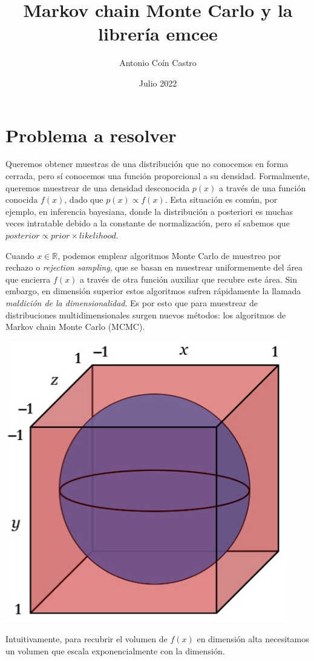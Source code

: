 \documentclass[
  a4paper,
	fontsize=11pt, %
	twoside=false, %
  secnumdepth=2,
	numbers=noenddot, %
]{kaohandt}
\newcommand{\R} {\ensuremath{\mathds{R}}}
\begin{document}
\title{Markov chain Monte Carlo y la librería emcee}
\author[FM]{Antonio Coín Castro}
\date{\normalsize{Julio 2022}}
\maketitle

\section{Problema a resolver}

Queremos obtener muestras de una distribución que no conocemos en forma cerrada, pero sí conocemos una función proporcional a su densidad. Formalmente, queremos muestrear de una densidad desconocida \(p(x)\) a través de una función conocida \(f(x)\), dado que \(p(x) \propto f(x)\). Esta situación es común, por ejemplo, en inferencia bayesiana, donde la distribución a posteriori es muchas veces intratable debido a la constante de normalización, pero sí sabemos que \(posterior \propto prior \times likelihood\).

Cuando \(x \in \R\), podemos emplear algoritmos Monte Carlo de muestreo por rechazo o \textit{rejection sampling}, que se basan en muestrear uniformemente del área que encierra \(f(x)\) a través de otra función auxiliar que recubre este área. Sin embargo, en dimensión superior estos algoritmos sufren rápidamente la llamada \textit{maldición de la dimensionalidad}. Es por esto que para muestrear de distribuciones multidimensionales surgen nuevos métodos: los algoritmos de Markov chain Monte Carlo (MCMC).

\begin{marginfigure}[*-9]
  \centering
  \includegraphics[width=.6\textwidth]{img/cube_sphere}
  \caption*{Intuitivamente, para recubrir el volumen de \(f(x)\) en dimensión alta necesitamos un volumen que escala exponencialmente con la dimensión.}
\end{marginfigure}
\end{document}
